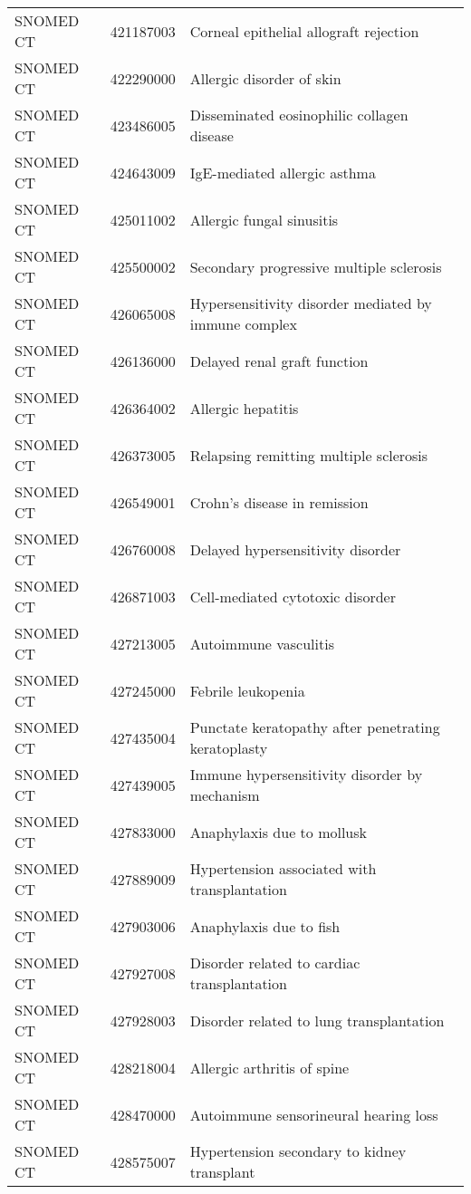 \begin{longtable}{p{}p{}p{}}
  SNOMED CT & 421187003 & Corneal epithelial allograft rejection \\ 
  SNOMED CT & 422290000 & Allergic disorder of skin \\ 
  SNOMED CT & 423486005 & Disseminated eosinophilic collagen disease \\ 
  SNOMED CT & 424643009 & IgE-mediated allergic asthma \\ 
  SNOMED CT & 425011002 & Allergic fungal sinusitis \\ 
  SNOMED CT & 425500002 & Secondary progressive multiple sclerosis \\ 
  SNOMED CT & 426065008 & Hypersensitivity disorder mediated by immune complex \\ 
  SNOMED CT & 426136000 & Delayed renal graft function \\ 
  SNOMED CT & 426364002 & Allergic hepatitis \\ 
  SNOMED CT & 426373005 & Relapsing remitting multiple sclerosis \\ 
  SNOMED CT & 426549001 & Crohn's disease in remission \\ 
  SNOMED CT & 426760008 & Delayed hypersensitivity disorder \\ 
  SNOMED CT & 426871003 & Cell-mediated cytotoxic disorder \\ 
  SNOMED CT & 427213005 & Autoimmune vasculitis \\ 
  SNOMED CT & 427245000 & Febrile leukopenia \\ 
  SNOMED CT & 427435004 & Punctate keratopathy after penetrating keratoplasty \\ 
  SNOMED CT & 427439005 & Immune hypersensitivity disorder by mechanism \\ 
  SNOMED CT & 427833000 & Anaphylaxis due to mollusk \\ 
  SNOMED CT & 427889009 & Hypertension associated with transplantation \\ 
  SNOMED CT & 427903006 & Anaphylaxis due to fish \\ 
  SNOMED CT & 427927008 & Disorder related to cardiac transplantation \\ 
  SNOMED CT & 427928003 & Disorder related to lung transplantation \\ 
  SNOMED CT & 428218004 & Allergic arthritis of spine \\ 
  SNOMED CT & 428470000 & Autoimmune sensorineural hearing loss \\ 
  SNOMED CT & 428575007 & Hypertension secondary to kidney transplant \\ 

\end{longtable}
